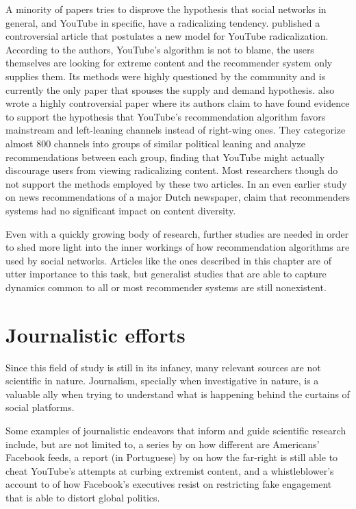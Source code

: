 
A minority of papers tries to disprove the hypothesis that social networks in
general, and YouTube in specific, have a radicalizing tendency.
\citet{munger_right-wing_2020} published a controversial article that postulates
a new model for YouTube radicalization. According to the authors, YouTube's
algorithm is not to blame, the users themselves are looking for extreme content
and the recommender system only supplies them. Its methods were highly
questioned by the community and is currently the only paper that spouses the
supply and demand hypothesis. \citet{ledwich_algorithmic_2019} also wrote a
highly controversial paper where its authors claim to have found evidence to
support the hypothesis that YouTube's recommendation algorithm favors mainstream
and left-leaning channels instead of right-wing ones. They categorize almost 800
channels into groups of similar political leaning and analyze recommendations
between each group, finding that YouTube might actually discourage users from
viewing radicalizing content. Most researchers though do not support the methods
employed by these two articles. In an even earlier study on news recommendations
of a major Dutch newspaper, \citet{moller_not_2018} claim that recommenders
systems had no significant impact on content diversity.

Even with a quickly growing body of research, further studies are needed in
order to shed more light into the inner workings of how recommendation
algorithms are used by social networks. Articles like the ones described in this
chapter are of utter importance to this task, but generalist studies that are
able to capture dynamics common to all or most recommender systems are still
nonexistent.

\section{Journalistic efforts}
\label{cap:journalistic}

Since this field of study is still in its infancy, many relevant sources are not
scientific in nature. Journalism, specially when investigative in nature, is a
valuable ally when trying to understand what is happening behind the curtains of
social platforms.

Some examples of journalistic endeavors that inform and guide scientific
research include, but are not limited to, a series by \citet{lecher_one_nodate}
on how different are Americans' Facebook feeds, a report (in Portuguese) by
\citet{ribeiro_como_2021} on how the far-right is still able to cheat YouTube's
attempts at curbing extremist content, and a whistleblower's account to
\citet{wong_how_2021} of how Facebook's executives resist on restricting
fake engagement that is able to distort global politics.
